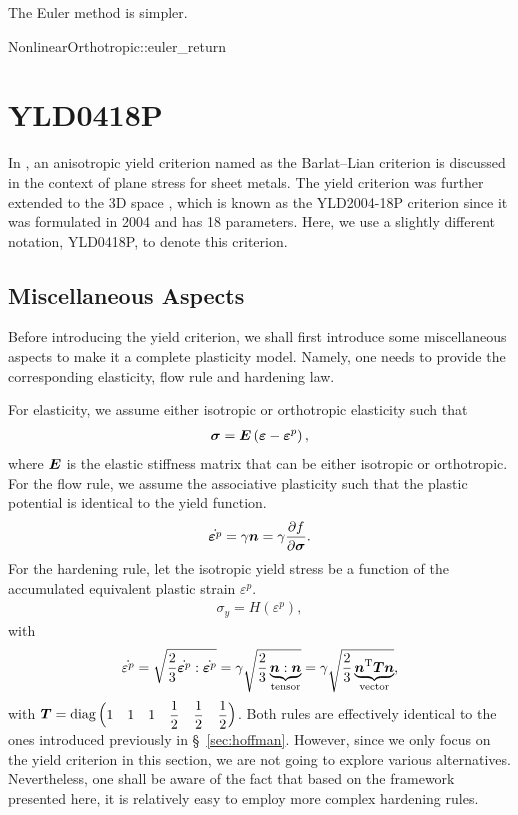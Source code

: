 The Euler method is simpler.
\begin{cppcode}
NonlinearOrthotropic::euler_return
\end{cppcode}
\section{YLD0418P}
In \cite{SouzaNeto2008}, an anisotropic yield criterion named as the Barlat--Lian criterion \cite{Barlat1989} is discussed in the context of plane stress for sheet metals.
The yield criterion was further extended to the 3D space \cite{Barlat2005}, which is known as the YLD2004-18P criterion since it was formulated in 2004 and has 18 parameters.
Here, we use a slightly different notation, YLD0418P, to denote this criterion.
\subsection{Miscellaneous Aspects}
Before introducing the yield criterion, we shall first introduce some miscellaneous aspects to make it a complete plasticity model.
Namely, one needs to provide the corresponding elasticity, flow rule and hardening law.

For elasticity, we assume either isotropic or orthotropic elasticity such that
\begin{gather}
    \bm{\sigma}=\bm{E}\left(\bm{\varepsilon}-\bm{\varepsilon}^p\right),
\end{gather}
where $\bm{E}$ is the elastic stiffness matrix that can be either isotropic or orthotropic.
For the flow rule, we assume the associative plasticity such that the plastic potential is identical to the yield function.
\begin{gather}
    \dot{\bm{\varepsilon}^p}=\gamma\bm{n}=\gamma\dfrac{\partial{f}}{\partial{\bm{\sigma}}}.
\end{gather}
For the hardening rule, let the isotropic yield stress be a function of the accumulated equivalent plastic strain $\varepsilon^p$.
\begin{gather}
    \sigma_y=H\left(\varepsilon^{p}\right),
\end{gather}
with
\begin{gather}
    \dot{\varepsilon^p}=\sqrt{\dfrac{2}{3}\dot{\bm{\varepsilon}^p}:\dot{\bm{\varepsilon}^p}}=\gamma\sqrt{\dfrac{2}{3}\underbrace{\bm{n}:\bm{n}}_\text{tensor}}=\gamma\sqrt{\dfrac{2}{3}\underbrace{\bm{n}^{\mathrm{T}}\bm{T}\bm{n}}_\text{vector}},
\end{gather}
with $\bm{T}=\text{diag}\left(\begin{matrix}
            1 & 1 & 1 & \dfrac{1}{2} & \dfrac{1}{2} & \dfrac{1}{2}
        \end{matrix}\right)$.
Both rules are effectively identical to the ones introduced previously in \S~\ref{sec:hoffman}.
However, since we only focus on the yield criterion in this section, we are not going to explore various alternatives.
Nevertheless, one shall be aware of the fact that based on the framework presented here, it is relatively easy to employ more complex hardening rules.
